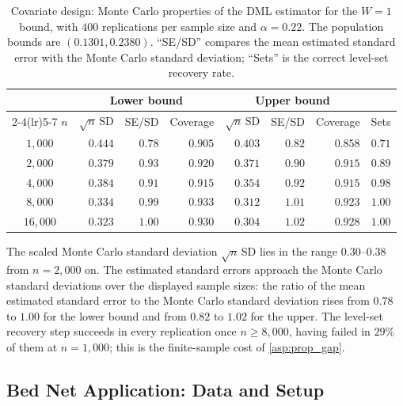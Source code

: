 \begin{table}[htbp]
\centering
\caption{Covariate design: Monte Carlo properties of the DML estimator for the $W=1$ bound, with $400$ replications per sample size and $\alpha=0.22$. The population bounds are $(0.1301,0.2380)$. ``SE/SD'' compares the mean estimated standard error with the Monte Carlo standard deviation; ``Sets'' is the correct level-set recovery rate.}
\label{tab:cov_mc}
\renewcommand{\arraystretch}{1.3}
\begin{tabular}{crrrrrrr}
\toprule
& \multicolumn{3}{c}{Lower bound} & \multicolumn{3}{c}{Upper bound} & \\
\cmidrule(lr){2-4}\cmidrule(lr){5-7}
$n$ & $\sqrt n\,\text{SD}$ & SE/SD & Coverage & $\sqrt n\,\text{SD}$ & SE/SD & Coverage & Sets \\
\midrule
$1{,}000$  & $0.444$ & $0.78$ & $0.905$ & $0.403$ & $0.82$ & $0.858$ & $0.71$ \\
$2{,}000$  & $0.379$ & $0.93$ & $0.920$ & $0.371$ & $0.90$ & $0.915$ & $0.89$ \\
$4{,}000$  & $0.384$ & $0.91$ & $0.915$ & $0.354$ & $0.92$ & $0.915$ & $0.98$ \\
$8{,}000$  & $0.334$ & $0.99$ & $0.933$ & $0.312$ & $1.01$ & $0.923$ & $1.00$ \\
$16{,}000$ & $0.323$ & $1.00$ & $0.930$ & $0.304$ & $1.02$ & $0.928$ & $1.00$ \\
\bottomrule
\end{tabular}
\end{table}

The scaled Monte Carlo standard deviation $\sqrt n\,\text{SD}$ lies in the range $0.30$--$0.38$ from $n=2{,}000$ on. The estimated standard errors approach the Monte Carlo standard deviations over the displayed sample sizes: the ratio of the mean estimated standard error to the Monte Carlo standard deviation rises from $0.78$ to $1.00$ for the lower bound and from $0.82$ to $1.02$ for the upper. The level-set recovery step succeeds in every replication once $n\geqslant8{,}000$, having failed in $29\%$ of them at $n=1{,}000$; this is the finite-sample cost of \cref{asp:prop_gap}.


\subsection{Bed Net Application: Data and Setup}

